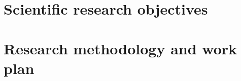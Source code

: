 \documentclass[11pt]{article}
\begin{document}
\section*{Scientific research objectives}


\section*{Research methodology and work plan}



\end{document}
